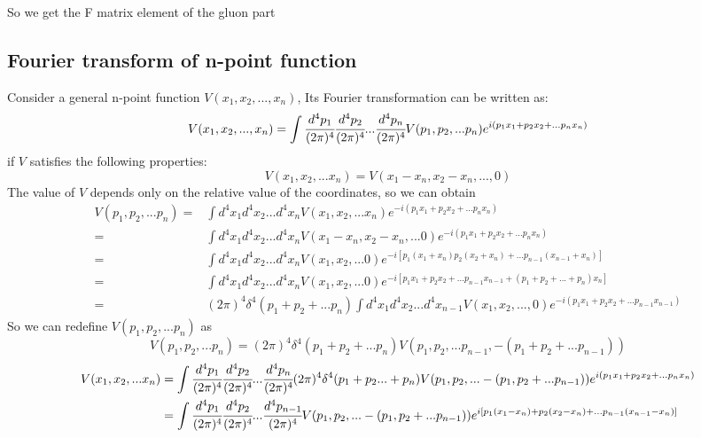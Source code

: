 \documentclass[UTF8]{article}
\begin{document}
So we get the F matrix element of the gluon part 
\begin{appendices}
\section{Fourier transform of n-point function}
Consider a general n-point function $V(x_1,x_2,...,x_n)$,
Its Fourier transformation can be written as:
\begin{equation}
V(x_1,x_2,...,x_n)=\int\cfrac{d^4p_1}{(2\pi)^4}
\cfrac{d^4p_2}{(2\pi)^4}...\cfrac{d^4p_n}{(2\pi)^4}
V(p_1,p_2,...p_n)e^{i(p_1x_1+p_2x_2+...p_nx_n)}
\end{equation}
if $V$ satisfies the following properties:
\begin{equation}
V(x_1,x_2,...x_n)=V(x_1-x_n,x_2-x_n,...,0)
\end{equation}
The value of $V$ depends only on the relative value of the coordinates, 
so we can obtain
\begin{equation}
\begin{split}
V(p_1,p_2,...p_n)=&\int d^4x_1d^4x_2...d^4x_nV(x_1,x_2,...x_n)
e^{-i(p_1x_1+p_2x_2+...p_nx_n)}\\
=&\int d^4x_1d^4x_2...d^4x_nV(x_1-x_n,x_2-x_n,...0)
e^{-i(p_1x_1+p_2x_2+...p_nx_n)}\\
=&\int d^4x_1d^4x_2...d^4x_nV(x_1,x_2,...0)
e^{-i[p_1(x_1+x_n)p_2(x_2+x_n)+...p_{n-1}(x_{n-1}+x_n)]}\\
=&\int d^4x_1d^4x_2...d^4x_nV(x_1,x_2,...0)
e^{-i[p_1x_1+p_2x_2+...p_{n-1}x_{n-1}+(p_1+p_2+...+p_n)x_n]}\\
=&(2\pi)^4\delta^4(p_1+p_2+...p_n)\int d^4x_1d^4x_2...d^4x_{n-1}
V(x_1,x_2,...,0)e^{-i(p_1x_1+p_2x_2+...p_{n-1}x_{n-1})}
\end{split}
\end{equation}
So we can redefine $V(p_1,p_2,...p_n)$ as
\begin{equation}
V(p_1,p_2,...p_n)=(2\pi)^4\delta^4(p_1+p_2+...p_n)
V(p_1,p_2,...p_{n-1},-(p_1+p_2+...p_{n-1}))
\end{equation}
\begin{equation}
\begin{split}
V(x_1,x_2,...x_n)
&=\int\cfrac{d^4p_1}{(2\pi)^4}\cfrac{d^4p_2}{(2\pi)^4}...
\cfrac{d^4p_n}{(2\pi)^4}(2\pi)^4\delta^4(p_1+p_2...+p_n)
V(p_1,p_2,...-(p_1,p_2+...p_{n-1}))e^{i(p_1x_1+p_2x_2+...p_nx_n)}\\
&=\int\cfrac{d^4p_1}{(2\pi)^4}\cfrac{d^4p_2}{(2\pi)^4}...
\cfrac{d^4p_{n-1}}{(2\pi)^4}V(p_1,p_2,...-(p_1,p_2+...p_{n-1}))
e^{i[p_1(x_1-x_n)+p_2(x_2-x_n)+...p_{n-1}(x_{n-1}-x_n)]}
\end{split}
\end{equation}
\end{appendices}
\end{document}

